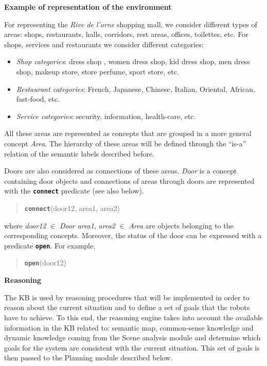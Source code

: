 \vspace{1em}

\noindent 
\textbf{Example of representation of the environment}

For representing the \emph{Rive de l'orne} shopping mall, we consider different types of areas: shops, restaurants, halls, corridors, rest areas, offices, toilettes, etc. For shops, services and restaurants we consider different categories:
\begin{itemize}
\item {\it Shop categories}: dress shop , women dress shop, kid dress shop, men dress shop, makeup store, store perfume, sport store, etc.
\item {\it Restaurant categories}: French, Japanese, Chinese, Italian, Oriental, African, fast-food, etc.
\item {\it Service categories}: security, information, health-care, etc.
\end{itemize}

All these areas are represented as concepts that are grouped in a more general concept \emph{Area}. The hierarchy of these areas will be defined through the ``is-a'' relation of the semantic labels described before.

Doors are also considered as connections of these areas. \emph{Door} is a concept containing door objects and connections of areas through doors are represented with the {\tt\bf connect} predicate (see also below).

\begin{quote}
{\tt\bf connect}(door12, area1, area2)
\end{quote}

\noindent
where \emph{door12} $\in$ \emph{Door} \emph{area1}, \emph{area2} $\in$ \emph{Area}  are objects belonging to the corresponding concepts. Moreover, the status of the door can be expressed with a predicate {\tt\bf open}. For example,

\begin{quote}
{\tt\bf open}(door12) \\
\end{quote}



\noindent 
\textbf{Reasoning} 


The KB is used by reasoning procedures that will be implemented in order to reason about the current situation and to define a set of goals that the \coaches robots have to achieve.
To this end, the reasoning engine takes into account the available information in the KB related to: semantic map, common-sense knowledge and dynamic knowledge coming from the Scene analysis module and determine which goals for the system are consistent with the current situation. This set of goals is then passed to the Planning module described below.



